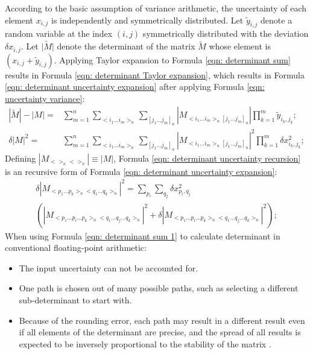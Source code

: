 \documentclass[twoside]{article}
\numberwithin{equation}{section}
\begin{document}
According to the basic assumption of variance arithmetic, the uncertainty of each element $x_{i,j}$ is independently and symmetrically distributed.  Let $ \widetilde{y}_{i,j}$ denote a random variable at the index $(i, j)$ symmetrically distributed with the deviation $\delta x_{i,j}$.  Let $\widetilde{|M|}$ denote the determinant of the matrix $\widetilde{M}$ whose element is $(x_{i,j} +  \widetilde{y}_{i,j})$.  Applying Taylor expansion to Formula \eqref{eqn: determinant sum} results in Formula \eqref{eqn: determinant Taylor expansion}, which results in Formula \eqref{eqn: determinant uncertainty expansion} after applying Formula \eqref{eqn: uncertainty variance}:
\begin{align}
\label{eqn: determinant Taylor expansion}
|\widetilde{M}| - |M| = &
\sum_{m=1}^{n} \sum_{<i_{1} \dots i_{m}>_{n}} \sum_{[j_{1} \dots j_{m}]_{n}}
  |M _{<i_{1} \dots i_{m}>_{n}{[j_{1} \dots j_{m}]}_{n}}| 
    \prod _{k=1}^{m}  \widetilde{y}_{i_{k}, j_{k}}; \\
\label{eqn: determinant uncertainty expansion}
{\delta |M|}^{2} = &
\sum_{m=1}^{n} \sum_{<i_{1} \dots i_{m}>_{n}} \sum_{[j_{1} \dots j_{m}]_{n}}
  |M _{<i_{1} \dots i_{m}>_{n}{[j_{1} \dots j_{m}]}_{n}}|^{2} 
    \prod _{k=1}^{m} \delta x_{i_{k}, j_{k}}^{2};
\end{align}
Defining $|M_{<>_{n} <>_{n}}| \equiv |M|$, Formula \eqref{eqn: determinant uncertainty recursion} is an recursive form of Formula \eqref{eqn: determinant uncertainty expansion}:
\begin{multline}
\label{eqn: determinant uncertainty recursion}
\delta |M_{<p_{1} \dots p_{k} >_{n} <q_{1} \dots q_{k} >_{n}}|^{2} = 
\sum_{p_{i}} \sum_{q_{j}} \delta x_{p_{i} ,q_{j}}^{2} \\ 
  (|M_{<p_{1} \dots p_{i} \dots p_{k}>_{n} <q_{1} \dots q_{j} \dots q_{k} >_{n}}|^{2} +  
   \delta |M_{<p_{1} \dots p_{i} \dots p_{k}>_{n} <q_{1} \dots q_{j} \dots q_{k} >_{n}}|^{2});
\end{multline}
When using Formula \eqref{eqn: determinant sum 1} to calculate determinant in conventional floating-point arithmetic:
\begin{itemize}
\item The input uncertainty can not be accounted for.
\item One path is chosen out of many possible paths, such as selecting a different sub-determinant to start with. 
\item Because of the rounding error, each path may result in a different result even if all elements of the determinant are precise, and the spread of all results is expected to be inversely proportional to the stability of the matrix \cite{Condition_Number}.  
\end{itemize}
\end{document}
